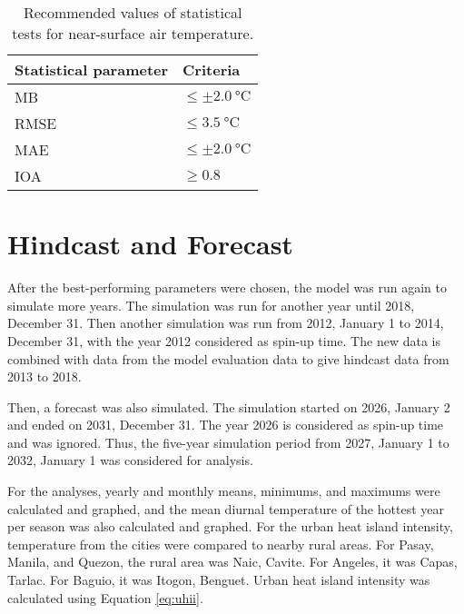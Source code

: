	\begin{table}	
		\caption{Recommended values of statistical tests for near-surface air temperature.}
		\label{tab:performance-statistics-threshold}
		\centering
		\begin{tabular}{l l}
			\hline \hline
			Statistical parameter & Criteria\\
			\hline
			MB & $\leq \pm \qty{2.0}{\degreeCelsius}$ \\
			RMSE & $\leq \qty{3.5}{\degreeCelsius}$\\
			MAE & $\leq \pm \qty{2.0}{\degreeCelsius}$\\
			IOA	& $\geq \num{0.8}$\\
			\hline
		\end{tabular}		
	\end{table}

\section{Hindcast and Forecast}
		After the best-performing parameters were chosen, the model was run again to simulate more years.
		The simulation was run for another year until 2018, December 31.
		Then another simulation was run from 2012, January 1 to 2014, December 31,
			with the year 2012 considered as spin-up time.
		The new data is combined with data from the model evaluation data to give hindcast data from 2013 to 2018.
		
		Then, a forecast was also simulated.
		The simulation started on 2026, January 2 and ended on 2031, December 31.
		The year 2026 is considered as spin-up time and was ignored.
		Thus, the five-year simulation period from 2027, January 1 to 2032, January 1 was considered for analysis.
		
		For the analyses, yearly and monthly means, minimums, and maximums were calculated and graphed, and the mean diurnal temperature of the hottest year per season was also calculated and graphed.
		For the urban heat island intensity, temperature from the cities were compared to nearby rural areas. For Pasay, Manila, and Quezon, the rural area was Naic, Cavite. For Angeles, it was Capas, Tarlac. For Baguio, it was Itogon, Benguet.
		Urban heat island intensity was calculated using Equation \ref{eq:uhii}.
		
